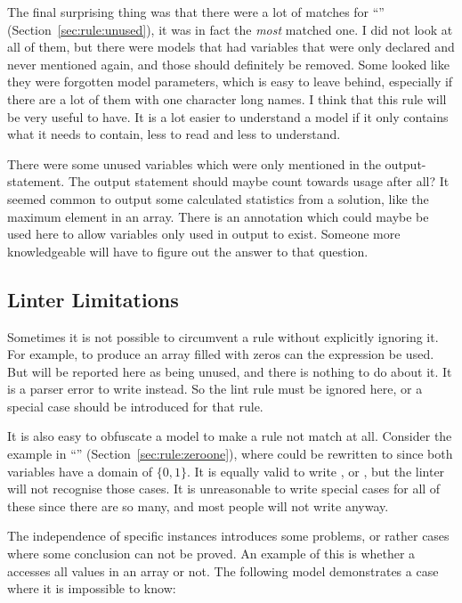 \documentclass[a4paper,12pt]{article}
\newcommand{\ruleref}[1]{``\nameref{sec:rule:#1}'' (Section~\ref{sec:rule:#1})}
\begin{document}
The final surprising thing was that there were a lot of matches for \ruleref{unused},
it was in fact the \emph{most} matched one. I did not look at all of them, but
there were models that had variables that were only declared and never mentioned again,
and those should definitely be removed.
Some looked like they were forgotten model parameters, which is easy to leave behind,
especially if there are a lot of them with one character long names. I think that this
rule will be very useful to have. It is a lot easier to understand a model if it only contains
what it needs to contain, less to read and less to understand.

There were some unused variables which were only mentioned in the output-statement. The
output statement should maybe count towards usage after all? It seemed common to output
some calculated statistics from a solution, like the maximum element in an array. There is
an  annotation which could maybe be used here to allow variables only used
in output to exist. Someone more knowledgeable will have to figure out the answer to that
question.

\subsection{Linter Limitations}\label{sec:disc:lintlimits}
Sometimes it is not possible to circumvent a rule without explicitly ignoring it. For
example, to produce an array filled with zeros can the expression \mzninlinebar{[0 | i in 1..k]} be
used. But  will be reported here as being unused, and there is nothing to do about
it. It is a parser error to write \mzninlinebar{[0 | \_ in 1..k]} instead. So the lint rule must be
ignored here, or a special case should be introduced for that rule.

It is also easy to obfuscate a model to make a rule not match at all. Consider
the example in \ruleref{zeroone}, where
 could be rewritten to  since both variables have a domain of
$\{0,1\}$. It is equally valid to write , or ,
but the linter will not recognise those cases. It is unreasonable to write special cases for
all of these since there are so many, and most people will not write  anyway.

The independence of specific instances introduces some problems, or rather cases where
some conclusion can not be proved.
An example of this is whether a 
accesses all values in an array or not. The following model demonstrates a case
where it is impossible to know:
\end{document}
